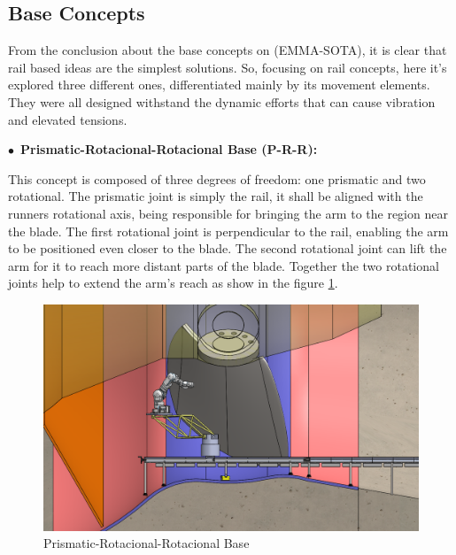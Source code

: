 \subsection{Base Concepts}

From the conclusion about the base concepts on (EMMA-SOTA), it is clear that
rail based ideas are the simplest solutions. So, focusing on rail concepts, here it's
explored three different ones, differentiated mainly by its movement elements.
They were all designed withstand the dynamic efforts that can cause vibration and
elevated tensions.


$\bullet$~\textbf{Prismatic-Rotacional-Rotacional Base (P-R-R):}
  
  This concept is composed of three degrees of freedom: one prismatic and two
  rotational. The prismatic joint is simply the rail, it shall be aligned with
  the runners rotational axis, being responsible for bringing the arm to the
  region near the blade. The first rotational joint is perpendicular to the
  rail, enabling the arm to be positioned even closer to the blade. The second
  rotational joint can lift the arm for it to reach more distant parts of the
  blade. Together the two rotational joints help to extend the arm's reach as
  show in the figure \ref{fig::base_prr}.

    
  \begin{figure}[h!]
   \centering
   \includegraphics[width=0.8\columnwidth]{figs/bases/base_prr}
   \caption{Prismatic-Rotacional-Rotacional Base}
   \label{fig::base_prr}
\end{figure}

